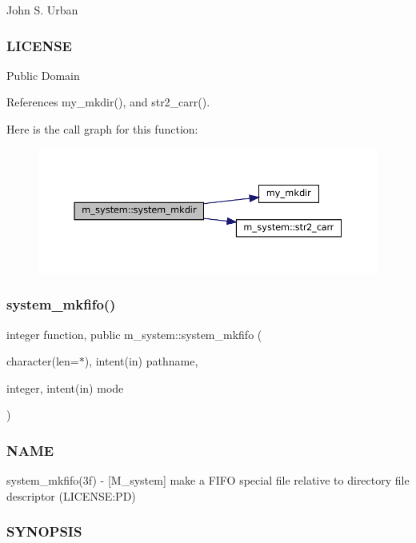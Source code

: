 John S. Urban \subsubsection*{L\+I\+C\+E\+N\+SE}

Public Domain 

References my\+\_\+mkdir(), and str2\+\_\+carr().

Here is the call graph for this function\+:\nopagebreak
\begin{figure}[H]
\begin{center}
\leavevmode
\includegraphics[width=350pt]{namespacem__system_a084d644c236d22af2cc75c6e48fd6e96_cgraph}
\end{center}
\end{figure}
\mbox{\label{namespacem__system_ab2d95258ee26b85a0283538880775475}} 
\subsubsection{\texorpdfstring{system\+\_\+mkfifo()}{system\_mkfifo()}}
{\footnotesize\ttfamily integer function, public m\+\_\+system\+::system\+\_\+mkfifo (\begin{DoxyParamCaption}\item[{character(len=$\ast$), intent(in)}]{pathname,  }\item[{integer, intent(in)}]{mode }\end{DoxyParamCaption})}



\subsubsection*{N\+A\+ME}

system\+\_\+mkfifo(3f) -\/ \mbox{[}M\+\_\+system\mbox{]} make a F\+I\+FO special file relative to directory file descriptor (L\+I\+C\+E\+N\+SE\+:PD) \subsubsection*{S\+Y\+N\+O\+P\+S\+IS}

